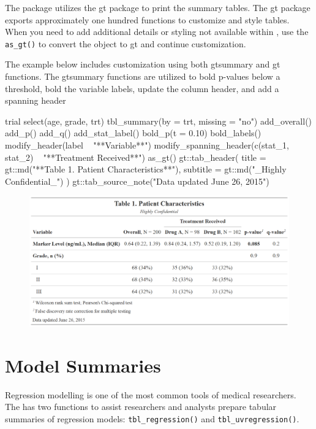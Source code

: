 The  package utilizes the gt package \citep{gt} to print the summary tables.
The gt package exports approximately one hundred functions to customize and style tables.
When you need to add additional details or styling not available within , use the \texttt{as\_gt()} to convert the  object to gt and continue customization.

The example below includes customization using both gtsummary and gt functions.
The gtsummary functions are utilized to bold p-values below a threshold, bold the variable labels,  update the column header, and add a spanning header

\begin{example}
trial %
  select(age, grade, trt) %
tbl_summary(by = trt, missing = "no") %
  add_overall() %
  add_p() %
  add_q() %
  add_stat_label() %
  bold_p(t = 0.10) %
  bold_labels() %
  modify_header(label ~ "**Variable**") %
  modify_spanning_header(c(stat_1, stat_2) ~ "**Treatment Received**") %
  as_gt() %
  gt::tab_header(
    title = gt::md("**Table 1. Patient Characteristics**"),
    subtitle = gt::md("_Highly Confidential_")
  ) %
  gt::tab_source_note("Data updated June 26, 2015")
\end{example}
\begin{figure}[h!]
  \includegraphics[scale=0.28]{custom.png}
  \centering
\end{figure}

\section{Model Summaries}

Regression modelling is one of the most common tools of medical researchers.
The  has two functions to assist researchers and analysts prepare tabular summaries of regression models: \texttt{tbl\_regression()} and \texttt{tbl\_uvregression()}.

